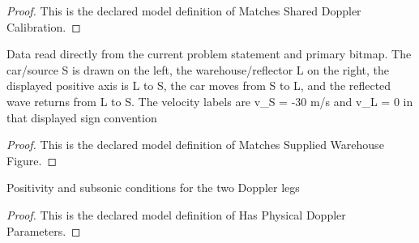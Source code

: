 \begin{proof}
  This is the declared model definition of Matches Shared Doppler Calibration.
\end{proof}
\begin{definition}
  \label{def:physics:phyx-mini-0197:phyxminiproblems-problemphyxmini0197-matchessuppliedwarehousefigure}
  Data read directly from the current problem statement and primary bitmap. The car/source S is drawn on the left, the warehouse/reflector L on the right, the displayed positive axis is L to S, the car moves from S to L, and the reflected wave returns from L to S. The velocity labels are v\_S = -30 m/s and v\_L = 0 in that displayed sign convention
\end{definition}
\begin{proof}
  This is the declared model definition of Matches Supplied Warehouse Figure.
\end{proof}
\begin{definition}
  \label{def:physics:phyx-mini-0197:phyxminiproblems-problemphyxmini0197-hasphysicaldopplerparameters}
  Positivity and subsonic conditions for the two Doppler legs
\end{definition}
\begin{proof}
  This is the declared model definition of Has Physical Doppler Parameters.
\end{proof}
